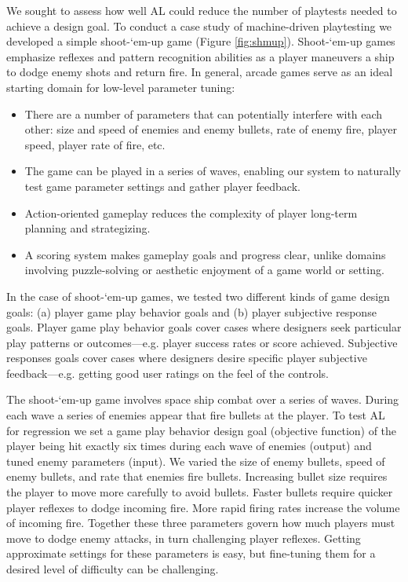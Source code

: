 \documentclass{sig-alternate}
\begin{document}
We sought to assess how well AL could reduce the number of playtests needed to achieve a design goal.
To conduct a case study of machine-driven playtesting we developed a simple shoot-`em-up game (Figure \ref{fig:shmup}).
Shoot-`em-up games emphasize reflexes and pattern recognition abilities as a player maneuvers a ship to dodge enemy shots and return fire.
%
In general, arcade games serve as an ideal starting domain for low-level parameter tuning:
\begin{itemize}
\item There are a number of parameters that can potentially interfere with each other: size and speed of enemies and enemy bullets, rate of enemy fire, player speed, player rate of fire, etc.
\item The game can be played in a series of waves, enabling our system to naturally test game parameter settings and gather player feedback.
\item Action-oriented gameplay reduces the complexity of player long-term planning and strategizing.
\item A scoring system makes gameplay goals and progress clear, unlike domains involving puzzle-solving or aesthetic enjoyment of a game world or setting.
\end{itemize}
%
In the case of shoot-`em-up games, we tested two different kinds of game design goals: (a) player game play behavior goals and (b) player subjective response goals.
Player game play behavior goals cover cases where designers seek particular play patterns or outcomes---e.g. player success rates or score achieved. 
Subjective responses goals cover cases where designers desire specific player subjective feedback---e.g. getting good user ratings on the feel of the controls.


The shoot-`em-up game involves space ship combat over a series of waves.
During each wave a series of enemies appear that fire bullets at the player. 
To test AL for regression we set a game play behavior design goal (objective function) of the player being hit exactly six times during each wave of enemies (output) and tuned enemy parameters (input).
We varied the size of enemy bullets, speed of enemy bullets, and rate that enemies fire bullets. 
Increasing bullet size requires the player to move more carefully to avoid bullets. 
Faster bullets require quicker player reflexes to dodge incoming fire. 
More rapid firing rates increase the volume of incoming fire. 
Together these three parameters govern how much players must move to dodge enemy attacks, in turn challenging player reflexes. 
Getting approximate settings for these parameters is easy, but fine-tuning them for a desired level of difficulty can be challenging. 
\end{document}
